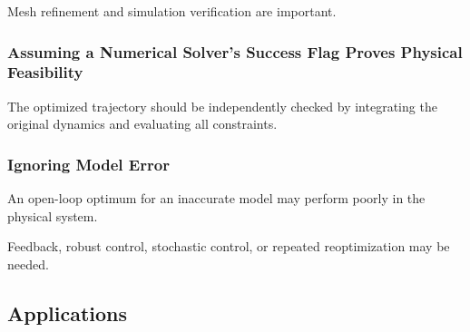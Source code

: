 Mesh refinement and simulation verification are important.

\subsubsection{Assuming a Numerical Solver's Success Flag Proves Physical Feasibility}

The optimized trajectory should be independently checked by integrating
the original dynamics and evaluating all constraints.

\subsubsection{Ignoring Model Error}

An open-loop optimum for an inaccurate model may perform poorly in the
physical system.

Feedback, robust control, stochastic control, or repeated reoptimization
may be needed.

\subsection{Applications}
\label{subsec:optimal-control-applications}

